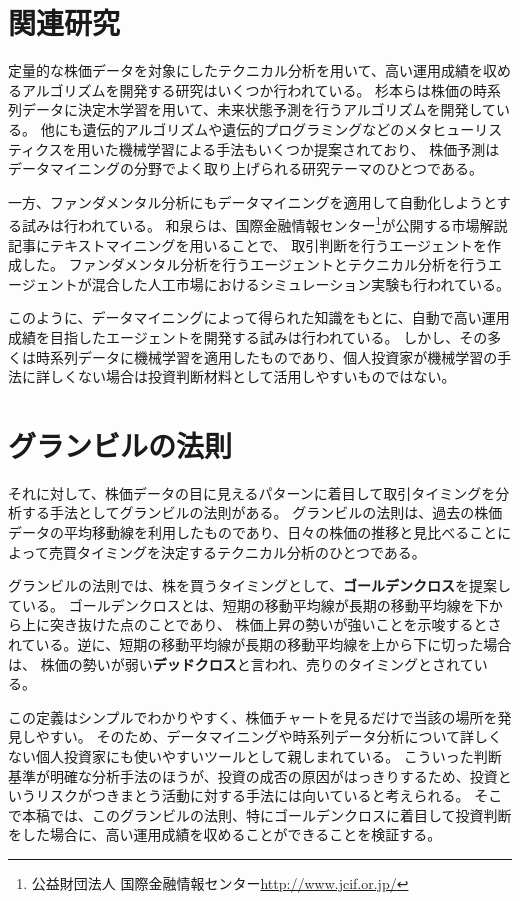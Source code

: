 \documentclass[twocolumn,jsaiac]{jarticle}
\begin{document}
\section{関連研究}
定量的な株価データを対象にしたテクニカル分析を用いて、高い運用成績を収めるアルゴリズムを開発する研究はいくつか行われている。
杉本らは株価の時系列データに決定木学習を用いて、未来状態予測を行うアルゴリズムを開発している\cite{decisiontree}。
他にも遺伝的アルゴリズムや遺伝的プログラミングなどのメタヒューリスティクスを用いた機械学習による手法もいくつか提案されており\cite{ga, gp}、
株価予測はデータマイニングの分野でよく取り上げられる研究テーマのひとつである。

一方、ファンダメンタル分析にもデータマイニングを適用して自動化しようとする試みは行われている。
和泉らは、国際金融情報センター\footnote{公益財団法人 国際金融情報センター\url{http://www.jcif.or.jp/}}が公開する市場解説記事にテキストマイニングを用いることで、
取引判断を行うエージェントを作成した\cite{multiagent}。
ファンダメンタル分析を行うエージェントとテクニカル分析を行うエージェントが混合した人工市場におけるシミュレーション実験も行われている\cite{short}。

このように、データマイニングによって得られた知識をもとに、自動で高い運用成績を目指したエージェントを開発する試みは行われている。
しかし、その多くは時系列データに機械学習を適用したものであり、個人投資家が機械学習の手法に詳しくない場合は投資判断材料として活用しやすいものではない。

\section{グランビルの法則}
それに対して、株価データの目に見えるパターンに着目して取引タイミングを分析する手法としてグランビルの法則がある。
グランビルの法則は、過去の株価データの平均移動線を利用したものであり、日々の株価の推移と見比べることによって売買タイミングを決定するテクニカル分析のひとつである\cite{granville}。

グランビルの法則では、株を買うタイミングとして、{\bf ゴールデンクロス}を提案している。
ゴールデンクロスとは、短期の移動平均線が長期の移動平均線を下から上に突き抜けた点のことであり、
株価上昇の勢いが強いことを示唆するとされている。逆に、短期の移動平均線が長期の移動平均線を上から下に切った場合は、
株価の勢いが弱い{\bf デッドクロス}と言われ、売りのタイミングとされている\cite{goldencross}。

この定義はシンプルでわかりやすく、株価チャートを見るだけで当該の場所を発見しやすい。
そのため、データマイニングや時系列データ分析について詳しくない個人投資家にも使いやすいツールとして親しまれている。
こういった判断基準が明確な分析手法のほうが、投資の成否の原因がはっきりするため、投資というリスクがつきまとう活動に対する手法には向いていると考えられる。
そこで本稿では、このグランビルの法則、特にゴールデンクロスに着目して投資判断をした場合に、高い運用成績を収めることができることを検証する。
\end{document}
